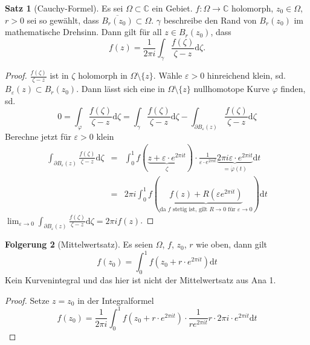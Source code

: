 \documentclass[11pt,titlepage]{article}
\theoremstyle{definition}
\newtheorem{theorem}{Satz}[section]
\newtheorem{corollary}[theorem]{Folgerung}
\theoremstyle{remark}
\begin{document}
	\begin{theorem}[Cauchy-Formel] \label{thm:CF}
		Es sei $\Omega\subset\mathbb{C}$ ein Gebiet. $f:\Omega\to\mathbb{C}$ holomorph, 
		$z_0\in\Omega$, $r>0$ sei so gewählt, dass $\overline{B_r (z_0)}\subset\Omega$. 
		$\gamma$ beschreibe den Rand von $B_r (z_0)$ im mathematische Drehsinn. Dann gilt 
		für all $z\in B_r (z_0)$, dass 
		\[ f(z)= \frac{1}{2 \pi i} \int_{\gamma} \frac{f(\zeta)}{\zeta -z}\mathrm{d}\zeta. \]
	\end{theorem}
	
	\begin{proof}
		$\frac{f(\zeta )}{\zeta -z}$ ist in $\zeta$ holomorph in $\Omega\setminus \{ z\}$. 
		Wähle $\varepsilon >0$ hinreichend klein, sd. $B_{\varepsilon}(z)\subset B_r (z_0)$. 
		Dann lässt sich eine in $\Omega\setminus \{ z \}$ nullhomotope Kurve $\varphi$ finden, sd.
		\[ 0= \int_{\varphi} \frac{f(\zeta)}{\zeta -z}\mathrm{d}\zeta = 
		\int_{\gamma}\frac{f(\zeta)}{\zeta -z} \mathrm{d}\zeta - \int_{\partial B_{\varepsilon}(z) }
		\frac{f(\zeta)}{\zeta - z}\mathrm{d}\zeta \]
		Berechne jetzt für $\varepsilon >0$ klein 
		\begin{eqnarray*}
			\int_{\partial B_{\varepsilon}(z)} \frac{f(\zeta)}{\zeta -z}\mathrm{d}\zeta &=& 
			\int_0^1 f(\underbrace{z+\varepsilon \cdot e^{2\pi it} }_{\zeta})\cdot 
			\frac{1}{\varepsilon \cdot e^{2\pi it}} \underbrace{2\pi i \varepsilon \cdot e^{2 \pi it}}_{=
			\dot{\varphi}(t)} \mathrm{d}t \\
			&=& 2\pi i \int_0^1 f(\underbrace{f(z)+R(\varepsilon e^{2\pi i t})}_{\text{da $f$ stetig ist, gilt 
			$R\to0$ für $\varepsilon\to 0$}})\mathrm{d}t
		\end{eqnarray*}
		$\lim_{\varepsilon\to 0} \int_{\partial B_{\varepsilon} (z)} \frac{f(\zeta)}{\zeta -z} \mathrm{d}\zeta
		=2\pi i f(z)$.
	\end{proof}
	
	\begin{corollary}[Mittelwertsatz]
		Es seien $\Omega$, $f$, $z_0$, $r$ wie oben, dann gilt 
		\[ f(z_0)= \int_0^1 f(z_0+r\cdot e^{2\pi it})\mathrm{d}t \]
		Kein Kurvenintegral und das hier ist nicht der Mittelwertsatz aus Ana 1.
	\end{corollary}
	
	\begin{proof}
		Setze $z=z_0$ in der Integralformel 
		\[ f(z_0)= \frac{1}{2\pi i} \int_0^1 f(z_0+r\cdot e^{2\pi it})\cdot \frac{1}{r e^{2\pi it}} r\cdot 2\pi i \cdot 
		e^{2\pi it}\mathrm{d}t \]
	\end{proof}
	
\end{document}
